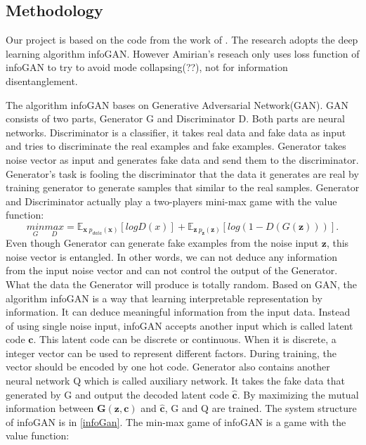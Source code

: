 
\subsection*{Methodology}
Our project is based on the code from the work of \cite{Amirian_2019_CVPR_Workshops}. The research adopts the deep learning algorithm infoGAN. However Amirian's reseach only uses loss function of infoGAN to try to avoid mode collapsing(??), not for information disentanglement.

The algorithm infoGAN bases on Generative Adversarial Network(GAN). GAN consists of two parts, Generator G and Discriminator D. Both parts are neural networks. Discriminator is a classifier, it takes real data and fake data as input and tries to discriminate the real examples and fake examples. Generator takes noise vector as input and generates fake data and send them to the discriminator. Generator's task is fooling the discriminator that the data it generates are real by training generator to generate samples that similar to the real samples. Generator and Discriminator actually play a two-players mini-max game with the value function\cite{goodfellow2014generative}:
\[\underset{G}{min}\underset{D}{max} = \mathbb{E}_{\mathbf{x}~p_{data}(\mathbf{x})}[logD(x)] + \mathbb{E}_{\mathbf{z}~p_{\mathbf{z}}(\mathbf{z})}[log(1 - D(G(\mathbf{z})))].\] Even though Generator can generate fake examples from the noise input \(\mathbf{z}\), this noise vector is entangled. In other words, we can not deduce any information from the input noise vector and can not control the output of the Generator. What the data the Generator will produce is totally random. Based on GAN, the algorithm infoGAN is a way that learning interpretable representation by information. It can deduce meaningful information from the input data. Instead of using single noise input, infoGAN accepts another input which is called latent code \(\mathbf{c}\). This latent code can be discrete or continuous. When it is discrete, a integer vector can be used to represent different factors. During training, the vector should be encoded by one hot code. Generator also contains another neural network Q which is called auxiliary network. It takes the fake data that generated by G and output the decoded latent code \( \mathbf{\hat{c}}\). By maximizing the mutual information between \( \mathbf{G(z, c)}\) and \( \mathbf{\hat{c}}\), G and Q are trained. The system structure of infoGAN is in \ref{infoGan}. The min-max game of infoGAN is a game with the value function\cite{infogan}:
